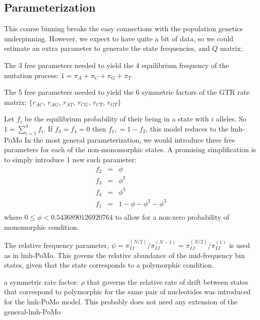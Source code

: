 \documentclass{llncs}
\begin{document}
\subsection*{Parameterization}
This coarse binning breaks the easy connections with the population genetics underpinning.
However, we expect to have quite a bit of data, so we
could estimate an extra parameter to generate the state frequencies, and $Q$ matrix:
\begin{compactitem}
    \item The 3 free parameters needed to yield the 4 equilibrium frequency
    of the mutation process: $1 = \pi_A + \pi_C + \pi_G + \pi_T$
    \item The 5 free parameters needed to yield the 6 symmetric factors
    of the GTR rate matrix:  $\{r_{AC}$, $r_{AG}$, $r_{AT}$, $r_{CG}$, $r_{CT}$, $r_{GT}\}$
    \item Let $f_i$ be the equilibrium probability of their being in a state with $i$ alleles.
    So $1 = \sum_{i=1}^{4}f_i$.
    If $f_3 = f_4 = 0$ then $f_1, = 1- f_2$, this model reduces to the lmh-PoMo
    In the most general parameterization, we would introduce three free parameters for each of the
    non-monomorphic states.
    A promising simplification is to simply introduce 1 new such parameter:
    \begin{eqnarray*}
        f_2 & = & \phi \\
        f_3 & = & \phi^2 \\
        f_4 & = & \phi^3 \\
        f_1 & = & 1 - \phi - \phi^2 - \phi^3 \\
    \end{eqnarray*}
    where $0\leq \phi < 0.5436890126920764$ to allow for a non-zero probability of monomorphic condition.
    \item The relative frequency parameter, 
    $\psi = \pi_{IJ}^{(N/2)}/\pi_{IJ}^{(N-1)} = \pi_{IJ}^{(N/2)}/\pi_{IJ}^{(1)}$ is used as in lmh-PoMo.
    This govens the relative abundance of the mid-frequency bin states, given that 
    the state corresponds to a polymorphic condition.

    \item a symmetric rate factor: $\rho$ that governs the relative rate of drift between
    states that correspond to polymorphic for the same pair of nucleotides was introduced for the lmh-PoMo
    model.
    This probably does not need any extension of the general-lmh-PoMo
\end{compactitem}
\end{document}
